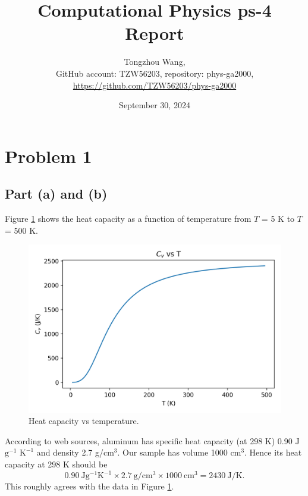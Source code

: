 \documentclass[11pt]{article}
\title{Computational Physics ps-4 Report}
\author{Tongzhou Wang, \\ GitHub account: TZW56203, repository: phys-ga2000, \\ \url{https://github.com/TZW56203/phys-ga2000}}
\date{September 30, 2024}
\begin{document}
\maketitle

\section{Problem 1}
\subsection{Part (a) and (b)}
Figure \ref{fig:C_v-T} shows the heat capacity as a function of temperature from $T$ = 5 K to $T$ = 500 K.
\begin{figure}[H]
    \centering
    \includegraphics[scale = 1.0]{images/ps-4-1ab.png}
    \caption{Heat capacity vs temperature.}
    \label{fig:C_v-T}
\end{figure}

According to web sources, aluminum has specific heat capacity (at 298 K) 0.90 J $\mathrm{g^{-1}}$ $\mathrm{K^{-1}}$ and density 2.7 g/$\mathrm{cm^3}$. Our sample has volume 1000 $\mathrm{cm^3}$. Hence its heat capacity at 298 K should be
\begin{equation}
    0.90 \ \mathrm{J} \mathrm{g^{-1}} \mathrm{K^{-1}} \times 2.7 \ \mathrm{g}/ \mathrm{cm^3} \times 1000 \ \mathrm{cm^3} = 2430 \ \mathrm{J}/\mathrm{K}.
\end{equation}
This roughly agrees with the data in Figure \ref{fig:C_v-T}.
\end{document}
